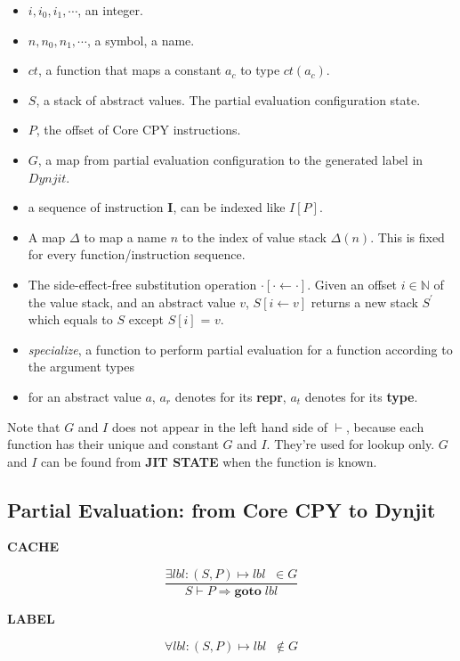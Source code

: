 \documentclass[12pt, a4paper]{report}
\newcommand{\rulegroup}[1]{
    \textbf{#1}
}
\begin{document}
\begin{itemize}
    \item $i, i_0, i_1, \cdots$, an integer.
    \item $n, n_0, n_1, \cdots$, a symbol, a name.
    \item $ct$, a function that maps a constant $a_c$ to type $ct(a_c)$.
    \item $S$, a stack of abstract values. The partial evaluation configuration state.
    \item $P$, the offset of Core CPY instructions.
    \item $G$, a map from partial evaluation configuration to the generated label in $Dynjit$.
    \item a sequence of instruction $\mathbf{I}$, can be indexed like $I[P]$.
    \item A map $\Delta$ to map a name $n$ to the index of value stack $\Delta(n)$. This is fixed for every function/instruction sequence.
    \item The side-effect-free substitution operation $\cdot[\cdot \leftarrow \cdot]$.
          Given an offset $i \in \mathbb{N}$ of the value stack, and an abstract value $v$,
          $S[i \leftarrow v]$ returns a new stack $S^{'}$ which equals to $S$ except $S[i]$ = $v$.
    \item \textit{specialize}, a function to perform partial evaluation for a function according to the argument types
    \item for an abstract value $a$, $a_r$ denotes for its \textbf{repr}, $a_t$ denotes for its \textbf{type}.
\end{itemize}

Note that $G$ and $I$ does not appear in the left hand side of $\vdash$, because each function has their unique and constant $G$ and $I$.
They're used for lookup only. $G$ and $I$ can be found from \textbf{JIT STATE} when the function is known.

\subsection*{Partial Evaluation: from Core CPY to Dynjit}

\hrulefill
\bigbreak

\rulegroup{CACHE}
$$
\dfrac{
    \exists \mathit{lbl} : (S, P) \mapsto \mathit{lbl} \; \; \in G
}{
    S \vdash P \Rightarrow \mathbf{goto} \; \mathit{lbl}
}
$$

\rulegroup{LABEL}

$$
\forall \mathit{lbl} : (S, P) \mapsto \mathit{lbl} \;\; \notin G
$$
\end{document}
